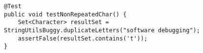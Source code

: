 \verb$@Test$\\
\verb$public void testNonRepeatedChar() {$\\
\verb$    Set<Character> resultSet = StringUtilsBuggy.duplicateLetters("software debugging");$\\
\verb$    assertFalse(resultSet.contains('t'));$\\
\verb$}$\\